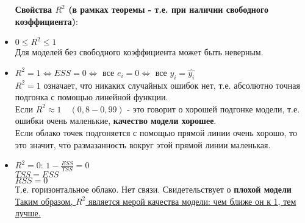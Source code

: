 \documentclass{article}
\begin{document}
\begin{itemize}
\textbf{Свойства $R^2$ (в рамках теоремы - т.е. при наличии свободного коэффициента)}:
\item $0 \leqslant R^2\leqslant 1$\\
Для моделей без свободного коэффициента может быть неверным.
\item $R^2=1 \Leftrightarrow ESS=0 \Leftrightarrow$ все $e_i=0 \Leftrightarrow$ все $y_i=\hat{y_i}$\\
$R^2=1$ означает, что никаких случайных ошибок нет, т.е. абсолютно точная подгонка с помощью линейной функции.\\
Если $R^2 \approx 1 \quad (0,8-0,99)$ - это говорит о хорошей подгонке модели, т.е. ошибки очень маленькие, \textbf{качество модели хорошее}.\\
Если облако точек подгоняется с помощью прямой линии очень хорошо, то это значит, что размазанность вокруг этой прямой линии маленькая. 
\item $R^2=0$:
$1-\frac{ESS}{TSS}=0$\\
$TSS=ESS$\\
$RSS=0$\\
Т.е. горизонтальное облако. Нет связи. Свидетельствует о \textbf{плохой модели}\\

\vspace{1ex}
\underline{Таким образом, $R^2$ является мерой качества модели: чем ближе он к 1, тем лучше.}



\end{itemize}

 
\end{document}
